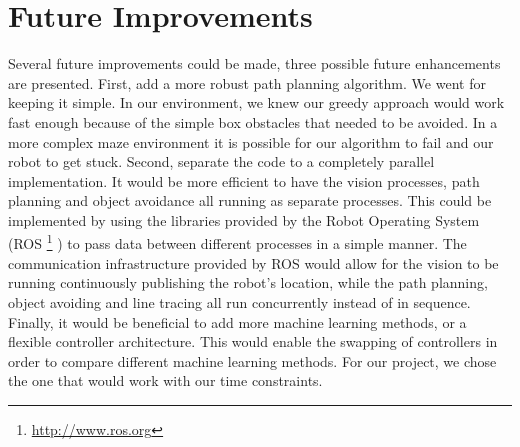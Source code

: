 \section{Future Improvements}
\label{section::future}

Several future improvements could be made, three possible future enhancements are presented. First, add a more robust path planning algorithm. We went for keeping it simple. In our environment, we knew our greedy approach would work fast enough because of the simple box obstacles that needed to be avoided. In a more complex maze environment it is possible for our algorithm to fail and our robot to get stuck. Second, separate the code to a completely parallel implementation. It would be more efficient to have the vision processes, path planning and object avoidance all running as separate processes. This could be implemented by using the libraries provided by the Robot Operating System (ROS \footnote{\url{http://www.ros.org}} ) to pass data between different processes in a simple manner. The communication infrastructure provided by ROS would allow for the vision to be running continuously publishing the robot’s location, while the path planning, object avoiding and line tracing all run concurrently instead of in sequence. Finally, it would be beneficial to add more machine learning methods, or a flexible controller architecture. This would enable the swapping of controllers in order to compare different machine learning methods. For our project, we chose the one that would work with our time constraints. 
